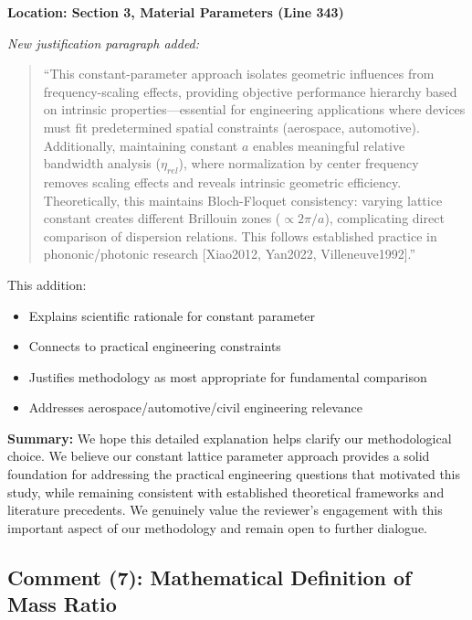 \documentclass[11pt,a4paper]{article}
\newenvironment{changesbox}{%
    \par\medskip\noindent{\color{changescolor}\rule{\linewidth}{2pt}}\par
    \noindent{\color{changescolor}\bfseries Manuscript Changes}\par\smallskip
}{%
    \par\noindent{\color{changescolor}\rule{\linewidth}{0.5pt}}\medskip
}
\begin{document}
\begin{changesbox}
\textbf{Location: Section 3, Material Parameters (Line 343)}

\textit{New justification paragraph added:}
\begin{quote}
\textcolor{redtext}{``This constant-parameter approach isolates geometric influences from frequency-scaling effects, providing objective performance hierarchy based on intrinsic properties---essential for engineering applications where devices must fit predetermined spatial constraints (aerospace, automotive). Additionally, maintaining constant $a$ enables meaningful relative bandwidth analysis ($\eta_{rel}$), where normalization by center frequency removes scaling effects and reveals intrinsic geometric efficiency. Theoretically, this maintains Bloch-Floquet consistency: varying lattice constant creates different Brillouin zones ($\propto 2\pi/a$), complicating direct comparison of dispersion relations. This follows established practice in phononic/photonic research [Xiao2012, Yan2022, Villeneuve1992].''}
\end{quote}

This addition:
\begin{itemize}
    \item Explains scientific rationale for constant parameter
    \item Connects to practical engineering constraints
    \item Justifies methodology as most appropriate for fundamental comparison
    \item Addresses aerospace/automotive/civil engineering relevance
\end{itemize}
\end{changesbox}

\textbf{Summary:} We hope this detailed explanation helps clarify our methodological choice. We believe our constant lattice parameter approach provides a solid foundation for addressing the practical engineering questions that motivated this study, while remaining consistent with established theoretical frameworks and literature precedents. We genuinely value the reviewer's engagement with this important aspect of our methodology and remain open to further dialogue.

\newpage

\subsection*{Comment (7): Mathematical Definition of Mass Ratio}
\end{document}
